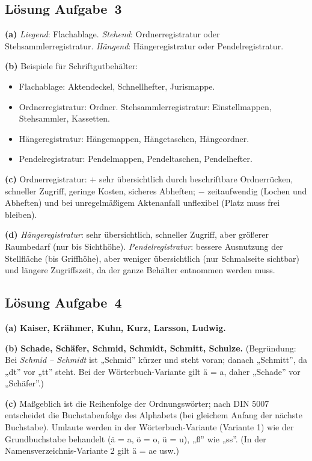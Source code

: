 \documentclass[11pt, a4paper]{article}
\begin{document}
\subsection*{Lösung Aufgabe~3}
\begin{loesung}
\textbf{(a)} \emph{Liegend}: Flachablage. \emph{Stehend}: Ordnerregistratur oder
Stehsammlerregistratur. \emph{Hängend}: Hängeregistratur oder Pendelregistratur.

\textbf{(b)} Beispiele für Schriftgutbehälter:
\begin{itemize}[itemsep=0pt]
  \item Flachablage: Aktendeckel, Schnellhefter, Jurismappe.
  \item Ordnerregistratur: Ordner. \quad Stehsammlerregistratur: Einstellmappen, Stehsammler, Kassetten.
  \item Hängeregistratur: Hängemappen, Hängetaschen, Hängeordner.
  \item Pendelregistratur: Pendelmappen, Pendeltaschen, Pendelhefter.
\end{itemize}

\textbf{(c)} Ordnerregistratur: $+$ sehr übersichtlich durch beschriftbare Ordnerrücken,
schneller Zugriff, geringe Kosten, sicheres Abheften; $-$ zeitaufwendig (Lochen und
Abheften) und bei unregelmäßigem Aktenanfall unflexibel (Platz muss frei bleiben).

\textbf{(d)} \emph{Hängeregistratur}: sehr übersichtlich, schneller Zugriff, aber
größerer Raumbedarf (nur bis Sichthöhe). \emph{Pendelregistratur}: bessere Ausnutzung
der Stellfläche (bis Griffhöhe), aber weniger übersichtlich (nur Schmalseite sichtbar)
und längere Zugriffszeit, da der ganze Behälter entnommen werden muss.
\end{loesung}

\subsection*{Lösung Aufgabe~4}
\begin{loesung}
\textbf{(a)} \textbf{Kaiser, Krähmer, Kuhn, Kurz, Larsson, Ludwig.}

\textbf{(b)} \textbf{Schade, Schäfer, Schmid, Schmidt, Schmitt, Schulze.} (Begründung:
Bei \emph{Schmid -- Schmidt} ist „Schmid” kürzer und steht voran; danach „Schmitt”, da
„dt” vor „tt” steht. Bei der Wörterbuch-Variante gilt ä = a, daher „Schade” vor
„Schäfer”.)

\textbf{(c)} Maßgeblich ist die Reihenfolge der Ordnungswörter; nach DIN 5007 entscheidet
die Buchstabenfolge des Alphabets (bei gleichem Anfang der nächste Buchstabe). Umlaute
werden in der Wörterbuch-Variante (Variante 1) wie der Grundbuchstabe behandelt (ä = a,
ö = o, ü = u), „ß” wie „ss”. (In der Namensverzeichnis-Variante 2 gilt ä = ae usw.)
\end{loesung}
\end{document}
